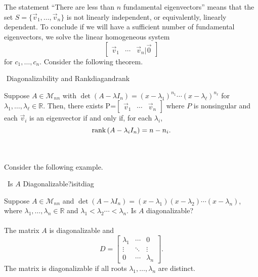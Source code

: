         \vphantom
        \\
        \\
        The statement ``There are less than \(n\) fundamental eigenvectors'' means that the set \(S=\{\vec{v}_1,\ldots,\vec{v}_n\}\) is not linearly independent, or equivalently, linearly dependent. To conclude if we will have a sufficient number of fundamental eigenvectors, we solve the linear homogeneous system
        \begin{equation*}
            \begin{bmatrix}
                \vec{v}_1 & \cdots & \vec{v}_n | \vec{0}
            \end{bmatrix}
        \end{equation*}
        for \(c_1,\ldots,c_n\). Consider the following theorem.
        \begin{theorem}{\Stop\,\,Diagonalizability and Rank}{diagandrank}
            
            Suppose \(A\in\mathcal{M}_{nn}\) with \(\det(A-\lambda I_n)=(x-\lambda_1)^{n_1}\cdots(x-\lambda_\ell)^{n_\ell}\) for 
            \(\lambda_1,\ldots,\lambda_\ell\in\mathbb{R}\). Then, there exists P=\(\begin{bmatrix} \vec{v}_1 & \cdots & \vec{v}_n \end{bmatrix}\) where \(P\) is nonsingular and each \(\vec{v}_i\) is an eigenvector if and only if, for each \(\lambda_i\),
            \begin{equation*}
                \text{rank\,}(A-\lambda_iI_n)=n-n_i.
            \end{equation*}
            
        \end{theorem}
        \pagebreak
        \vphantom
        \\
        \\
        Consider the following example.
        \begin{example}{\Difficulty\,\Difficulty\,\,Is \(A\) Diagonalizable?}{isitdiag}
            
            Suppose \(A\in\mathcal{M}_{nn}\) and \(\det(A-\lambda I_n)=(x-\lambda_1)(x-\lambda_2)\cdots(x-\lambda_n)\), where \(\lambda_1,\ldots,\lambda_n\in\mathbb{R}\) and \(\lambda_1<\lambda_2\cdots<\lambda_n\). Is \(A\) diagonalizable?
            \\
            \\
            The matrix \(A\) is diagonalizable and
            \begin{equation*}
                D=\begin{bmatrix} 
                    \lambda_1 & \cdots & 0 \\
                    \vdots & \ddots & \vdots \\
                    0 & \cdots & \lambda_n
                \end{bmatrix}.
            \end{equation*}
            The matrix is diagonalizable if all roots \(\lambda_1,\ldots,\lambda_n\) are distinct.

        \end{example}
